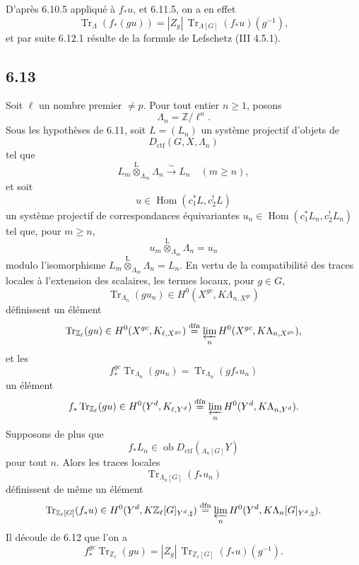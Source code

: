 \documentclass[11pt]{article}
\DeclareMathOperator{\Hom}{Hom}
\providecommand{\Tr}{\operatorname{Tr}}
\providecommand{\Tr}{\operatorname{Tr}}
\providecommand{\lten}{\overset{\mathrm L}{\otimes}}
\providecommand{\Ob}{\operatorname{ob}}
\providecommand{\Tr}{\operatorname{Tr}}
\providecommand{\Hom}{\operatorname{Hom}}
\providecommand{\lten}{\overset{\mathrm L}{\otimes}}
\providecommand{\lten}{\overset{\mathrm L}{\otimes}}
\providecommand{\Ob}{\operatorname{ob}}
\providecommand{\Tr}{\operatorname{Tr}}
\providecommand{\lten}{\overset{\mathrm L}{\otimes}}
\providecommand{\lten}{\overset{\mathrm L}{\otimes}}
\providecommand{\Ob}{\operatorname{Ob}}
\providecommand{\lten}{\overset{\mathrm L}{\otimes}}
\providecommand{\Hom}{\operatorname{Hom}}
\providecommand{\Tr}{\operatorname{Tr}}
\providecommand{\Ob}{\operatorname{ob}}
\providecommand{\Ob}{\operatorname{Ob}}
\providecommand{\lten}{\overset{\mathrm L}{\otimes}}
\begin{document}
D'après 6.10.5 appliqué à $f_*u$, et 6.11.5, on a en effet
\[
\Tr_{\Lambda}(f_*(gu))=|Z_g|\,\Tr_{\Lambda[G]}(f_*u)(g^{-1}),
\]
et par suite 6.12.1 résulte de la formule de Lefschetz (III 4.5.1).

\subsection*{6.13}
Soit $\ell$ un nombre premier $\ne p$. Pour tout entier $n\ge1$, posons
\[
\Lambda_n=\mathbb Z/\ell^n.
\]
Sous les hypothèses de 6.11, soit $L=(L_n)$ un système projectif d'objets de
\[
D_{\mathrm{ctf}}(G,X,\Lambda_n)
\]
tel que
\[
L_m\lten_{\Lambda_m}\Lambda_n\xrightarrow{\sim}L_n\quad (m\ge n),
\]
et soit
\[
u\in\Hom(c_1^*L,c_2^!L)
\]
un système projectif de correspondances équivariantes $u_n\in\Hom(c_1^*L_n,c_2^!L_n)$ tel que, pour $m\ge n$,
\[
u_m\lten_{\Lambda_m}\Lambda_n=u_n
\]
modulo l'isomorphisme $L_m\lten_{\Lambda_m}\Lambda_n=L_n$. En vertu de la compatibilité des traces locales à l'extension des scalaires, les termes locaux, pour $g\in G$,
\[
\Tr_{\Lambda_n}(gu_n)\in H^0(X^{gc},K\Lambda_{n,X^{gc}})
\]
définissent un élément
\[
\Tr_{\mathbb Z_{\ell}}(gu)\in
H^0(X^{gc},K_{\ell,X^{gc}})
\stackrel{\mathrm{dfn}}{=}
\varprojlim_n H^0(X^{gc},K\Lambda_{n,X^{gc}}),
\]
et les
\[
f_*^{gc}\Tr_{\Lambda_n}(gu_n)=\Tr_{\Lambda_n}(gf_*u_n)
\]
un élément
\[
f_*\Tr_{\mathbb Z_{\ell}}(gu)\in
H^0(Y^d,K_{\ell,Y^d})
\stackrel{\mathrm{dfn}}{=}
\varprojlim_n H^0(Y^d,K\Lambda_{n,Y^d}).
\]
Supposons de plus que
\[
f_*L_n\in\Ob D_{\mathrm{ctf}}({}_{\Lambda_n[G]}Y)
\]
pour tout $n$. Alors les traces locales
\[
\Tr_{\Lambda_n[G]}(f_*u_n)
\]
définissent de même un élément
\[
\Tr_{\mathbb Z_{\ell}[G]}(f_*u)\in
H^0(Y^d,K\mathbb Z_{\ell}[G]_{Y^d,\natural})
\stackrel{\mathrm{dfn}}{=}
\varprojlim_n H^0(Y^d,K\Lambda_n[G]_{Y^d,\natural}).
\]
Il découle de 6.12 que l'on a
\begin{equation}
f_*^{gc}\Tr_{\mathbb Z_{\ell}}(gu)
=
|Z_g|\,\Tr_{\mathbb Z_{\ell}[G]}(f_*u)(g^{-1}).
\tag{6.13.1}
\end{equation}
\end{document}
